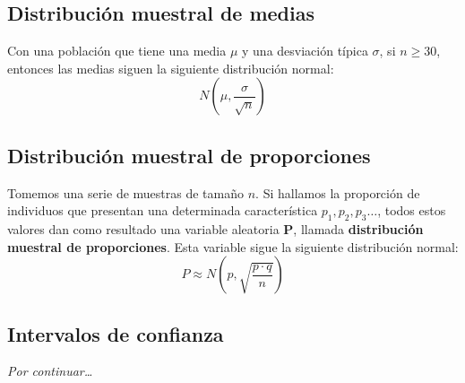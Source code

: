 \documentclass{article}
\begin{document}
\subsection*{Distribución muestral de medias}
Con una población que tiene una media $\mu$ y una desviación típica $\sigma$, si $n\geq 30$, entonces las medias siguen la siguiente distribución normal:
\[
    N(\mu, \frac{\sigma}{\sqrt{n}})
\]

\subsection*{Distribución muestral de proporciones}
Tomemos una serie de muestras de tamaño $n$. Si hallamos la proporción de individuos que presentan una determinada característica $p_1, p_2, p_3\dots$,
todos estos valores dan como resultado una variable aleatoria $\bm{P}$, llamada \textbf{distribución muestral de proporciones}. Esta variable sigue la
siguiente distribución normal:
\[
    P\approx N(p, \sqrt{ \frac{p\cdot q}{n}})
\]

\subsection*{Intervalos de confianza}
\textit{Por continuar\dots} 
\end{document}
